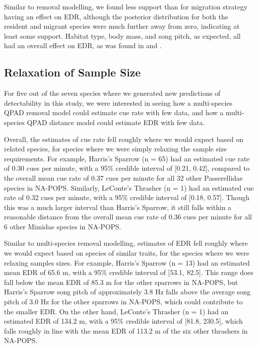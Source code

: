 \documentclass[12pt]{article}
\begin{document}
\par Similar to removal modelling, we found less support than \citet{solymos_phylogeny_2018} for migration strategy having an effect on EDR, although the posterior distribution for both the resident and migrant species were much further away from zero, indicating at least some support.
Habitat type, body mass, and song pitch, as expected, all had an overall effect on EDR, as was found in \citet{solymos_phylogeny_2018} and \cite{johnston_species_2014}.

\subsection{Relaxation of Sample Size}

\par For five out of the seven species where we generated new predictions of detectability in this study, we were interested in seeing how a multi-species QPAD removal model could estimate cue rate with few data, and how a multi-species QPAD distance model could estimate EDR with few data.

\par Overall, the estimates of cue rate fell roughly where we would expect based on related species, for species where we were simply relaxing the sample size requirements.
For example, Harris's Sparrow (n = 65) had an estimated cue rate of 0.30 cues per minute, with a 95\% credible interval of [0.21, 0.42], compared to the overall mean cue rate of 0.37 cues per minute for all 32 other Passerellidae species in NA-POPS.
Similarly, LeConte's Thrasher (n = 1) had an estimated cue rate of 0.32 cues per minute, with a 95\% credible interval of [0.18, 0.57].
Though this was a much larger interval than Harris's Sparrow, it still falls within a reasonable distance from the overall mean cue rate of 0.36 cues per minute for all 6 other Mimidae species in NA-POPS.

\par Similar to multi-species removal modelling, estimates of EDR fell roughly where we would expect based on species of similar traits, for the species where we were relaxing samples sizes.
For example, Harris's Sparrow (n = 13) had an estimated mean EDR of 65.6 m, with a 95\% credible interval of [53.1, 82.5].
This range does fall below the mean EDR of 85.3 m for the other sparrows in NA-POPS, but Harris's Sparrow song pitch of approximately 3.8 Hz falls above the average song pitch of 3.0 Hz for the other sparrows in NA-POPS, which could contribute to the smaller EDR.
On the other hand, LeConte's Thrasher (n = 1) had an estimated EDR of 134.2 m, with a 95\% credible interval of [81.8, 230.5], which falls roughly in line with the mean EDR of 113.2 m of the six other thrashers in NA-POPS.
\end{document}
